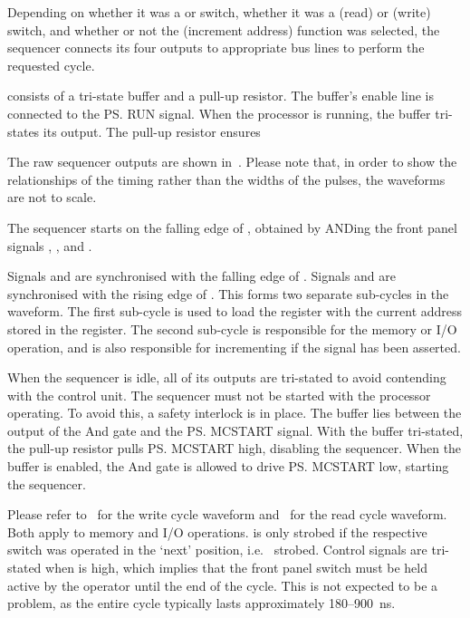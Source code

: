 Depending on whether it was a  or  switch, whether
it was a  (read) or  (write) switch, and whether or not
the  (increment address) function was selected, the sequencer connects
its four outputs to appropriate bus lines to perform the requested cycle. 

consists of a tri-state buffer and
a pull-up resistor. The buffer's enable line is connected to the \ps{RUN}
signal. When the processor is running, the buffer tri-states its output. The
pull-up resistor ensures

The raw sequencer outputs are shown in~. Please note that, in
order to show the relationships of the timing rather than the widths of the
pulses, the waveforms are not to scale.

The sequencer starts on the falling edge of , obtained by ANDing
the front panel signals , ,  and .

Signals  and  are synchronised with the falling edge of
. Signals  and  are synchronised with the rising
edge of . This forms two separate sub-cycles in the waveform. The first
sub-cycle is used to load the \MAR{} register with the current address stored
in the \PC{} register. The second sub-cycle is responsible for the memory or
I/O operation, and is also responsible for incrementing \PC{} if the
 signal has been asserted.

When the sequencer is idle, all of its outputs are tri-stated to avoid
contending with the control unit. The sequencer must not be started with the
processor operating. To avoid this, a safety interlock is in place. The buffer
lies between the output of the And gate and the \ps{MCSTART} signal. With the
buffer tri-stated, the pull-up resistor pulls \ps{MCSTART} high, disabling the
sequencer. When the buffer is enabled, the And gate is allowed to drive
\ps{MCSTART} low, starting the sequencer.

Please refer to~ for the write cycle waveform
and~ for the read cycle waveform. Both apply to memory and
I/O operations.  is only strobed if the respective switch was
operated in the ‘next’ position, i.e.\  strobed. Control signals
are tri-stated when  is high, which implies that the front panel
switch must be held active by the operator until the end of the cycle. This is
not expected to be a problem, as the entire cycle typically lasts approximately
180–900~ns.

